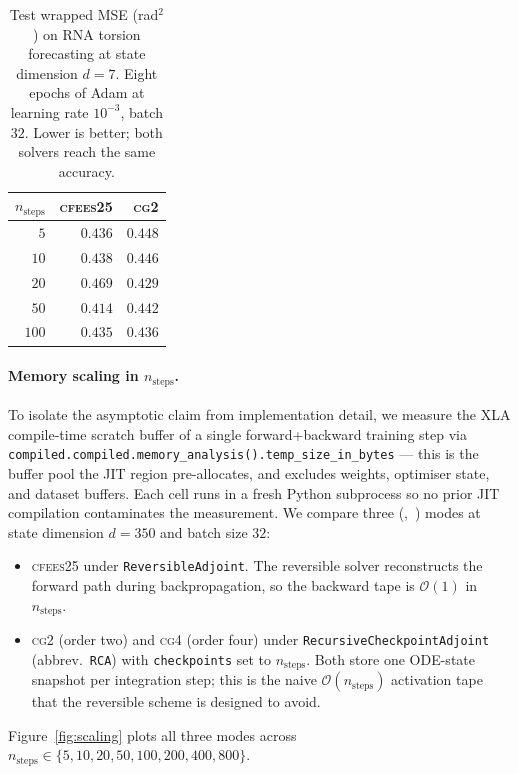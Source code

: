 \documentclass[11pt,a4paper]{article}
\newcommand{\cfees}{\textsc{cfees25}}
\newcommand{\cgtwo}{\textsc{cg2}}
\newcommand{\cgfour}{\textsc{cg4}}
\begin{document}
\begin{table}[hbt]
\centering
\small
\caption{Test wrapped MSE (rad$^2$) on RNA torsion forecasting at
state dimension $d=7$. Eight epochs of Adam at learning rate
$10^{-3}$, batch $32$. Lower is better; both solvers reach the same
accuracy.}
\label{tab:loss}
\begin{tabular}{r rr}
\toprule
$n_{\mathrm{steps}}$ & \cfees{} & \cgtwo{} \\
\midrule
   $5$ & $0.436$ & $0.448$ \\
  $10$ & $0.438$ & $0.446$ \\
  $20$ & $0.469$ & $0.429$ \\
  $50$ & $0.414$ & $0.442$ \\
 $100$ & $0.435$ & $0.436$ \\
\bottomrule
\end{tabular}
\end{table}

\paragraph{Memory scaling in $n_{\mathrm{steps}}$.}
To isolate the asymptotic claim from implementation detail, we
measure the XLA compile-time scratch buffer of a single
forward+backward training step via
\texttt{compiled.compiled.memory\_analysis().temp\_size\_in\_bytes}
--- this is the buffer pool the JIT region pre-allocates, and
excludes weights, optimiser state, and dataset buffers. Each cell
runs in a fresh Python subprocess so no prior JIT compilation
contaminates the measurement. We compare three
(,~) modes at state dimension $d = 350$
and batch size $32$:
\begin{itemize}
\setlength{\itemsep}{0pt}
\item \cfees{} under \texttt{ReversibleAdjoint}. The reversible
solver reconstructs the forward path during backpropagation, so
the backward tape is $\mathcal{O}(1)$ in $n_{\mathrm{steps}}$.
\item \cgtwo{} (order two) and \cgfour{} (order four) under
\texttt{RecursiveCheckpointAdjoint} (abbrev.\ \texttt{RCA}) with
\texttt{checkpoints} set to $n_{\mathrm{steps}}$. Both store one
ODE-state snapshot per integration step; this is the naive
$\mathcal{O}(n_{\mathrm{steps}})$ activation tape that the
reversible scheme is designed to avoid.
\end{itemize}
Figure~\ref{fig:scaling} plots all three modes across
$n_{\mathrm{steps}} \in \{5, 10, 20, 50, 100, 200, 400, 800\}$.
\end{document}

